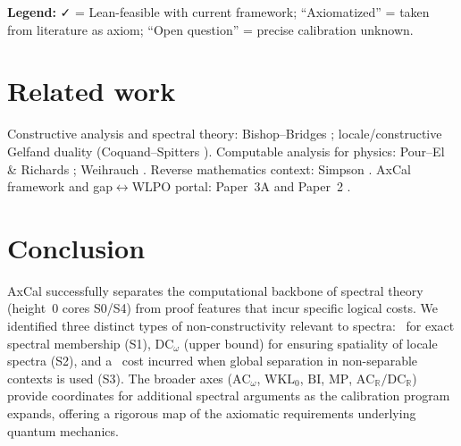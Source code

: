 \documentclass[11pt]{article}
\theoremstyle{plain}
\theoremstyle{definition}
\theoremstyle{remark}
\newcommand{\WLPO}{\mathrm{WLPO}}
\newcommand{\DCw}{\mathrm{DC}_\omega}
\newcommand{\ACw}{\mathrm{AC}_\omega}
\newcommand{\ACR}{\mathrm{AC}_{\mathbb{R}}}
\newcommand{\DCR}{\mathrm{DC}_{\mathbb{R}}}
\newcommand{\WKLz}{\mathrm{WKL}_0}
\newcommand{\BI}{\mathrm{BI}}
\newcommand{\MP}{\mathrm{MP}}
\begin{document}
\noindent\textbf{Legend:} ✓ = Lean-feasible with current framework; ``Axiomatized'' = taken from literature as axiom; ``Open question'' = precise calibration unknown.

\section{Related work}

Constructive analysis and spectral theory: Bishop--Bridges \cite{BishopBridges}; locale/constructive Gelfand duality (Coquand--Spitters \cite{CoquandSpitters}).
Computable analysis for physics: Pour--El \& Richards \cite{PourElRichards}; Weihrauch \cite{Weihrauch}. Reverse mathematics context: Simpson \cite{Simpson}.
AxCal framework and gap$\leftrightarrow$WLPO portal: Paper~3A \cite{Paper3A} and Paper~2 \cite{Paper2}.

\section{Conclusion}

AxCal successfully separates the computational backbone of spectral theory (height~0 cores S0/S4) from proof features that incur specific logical costs.
We identified three distinct types of non-constructivity relevant to spectra:
\MP\ for exact spectral membership (S1), $\DCw$ (upper bound) for ensuring spatiality of locale spectra (S2), and a \WLPO\ cost incurred when global separation in non-separable contexts is used (S3).
The broader axes ($\ACw$, $\WKLz$, $\BI$, $\MP$, $\ACR/\DCR$) provide coordinates for additional spectral arguments as the calibration program expands, offering a rigorous map of the axiomatic requirements underlying quantum mechanics.

\bigskip
\end{document}
